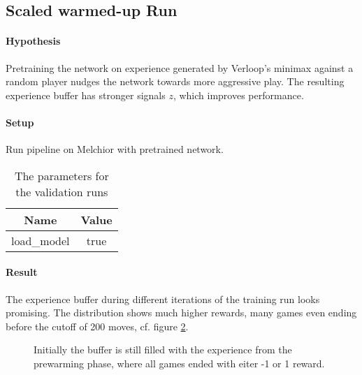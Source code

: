\subsection{Scaled warmed-up Run}
\paragraph{Hypothesis} Pretraining the network on experience generated by Verloop's minimax against a random player nudges the network towards more aggressive play. The resulting experience buffer has stronger signals $z$, which improves performance.

\paragraph{Setup} Run pipeline on Melchior with pretrained network.

\begin{table}[!h]
    \begin{center}
        \begin{tabular}{ c|c }
            Name        & Value \\
            \hline
            \hline
            load\_model & true  \\
        \end{tabular}
    \end{center}
    \caption{The parameters for the validation runs}
\end{table}

\paragraph{Result} The experience buffer during different iterations of the training run looks promising. The distribution shows much higher rewards, many games even ending before the cutoff of 200 moves, cf. figure \ref{performance_remote_warmed_up_exp_buffer}.

\begin{figure}[!h]
    \centering
    \hfill
    \caption{}
    \label{performance_remote_warmed_up}
\end{figure}

\begin{figure}[!h]
    \centering
    \hfill
    \caption{Initially the buffer is still filled with the experience from the prewarming phase, where all games ended with eiter -1 or 1 reward.}
    \label{performance_remote_warmed_up_exp_buffer}
\end{figure}

